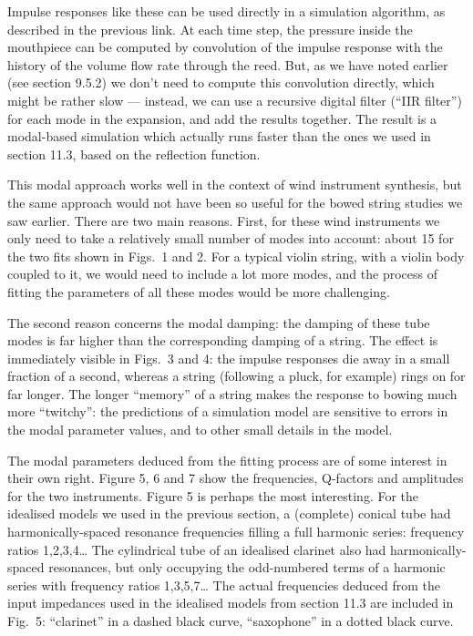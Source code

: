 

  Impulse responses like these can be used directly in a simulation algorithm, 
  as described in the previous link. At each time step, the pressure inside the 
  mouthpiece can be computed by convolution of the impulse response with the 
  history of the volume flow rate through the reed. But, as we have noted 
  earlier (see section 9.5.2) we don’t need to compute this convolution 
  directly, which might be rather slow — instead, we can use a recursive 
  digital filter (“IIR filter”) for each mode in the expansion, and add the 
  results together. The result is a modal-based simulation which actually runs 
  faster than the ones we used in section 11.3, based on the reflection 
  function. 

  This modal approach works well in the context of wind instrument synthesis, 
  but the same approach would not have been so useful for the bowed string 
  studies we saw earlier. There are two main reasons. First, for these wind 
  instruments we only need to take a relatively small number of modes into 
  account: about 15 for the two fits shown in Figs.\ 1 and 2. For a typical 
  violin string, with a violin body coupled to it, we would need to include a 
  lot more modes, and the process of fitting the parameters of all these modes 
  would be more challenging. 

  The second reason concerns the modal damping: the damping of these tube modes 
  is far higher than the corresponding damping of a string. The effect is 
  immediately visible in Figs.\ 3 and 4: the impulse responses die away in a 
  small fraction of a second, whereas a string (following a pluck, for example) 
  rings on for far longer. The longer “memory” of a string makes the response 
  to bowing much more “twitchy”: the predictions of a simulation model are 
  sensitive to errors in the modal parameter values, and to other small details 
  in the model. 

  The modal parameters deduced from the fitting process are of some interest in 
  their own right. Figure 5, 6 and 7 show the frequencies, Q-factors and 
  amplitudes for the two instruments. Figure 5 is perhaps the most interesting. 
  For the idealised models we used in the previous section, a (complete) 
  conical tube had harmonically-spaced resonance frequencies filling a full 
  harmonic series: frequency ratios 1,2,3,4… The cylindrical tube of an 
  idealised clarinet also had harmonically-spaced resonances, but only 
  occupying the odd-numbered terms of a harmonic series with frequency ratios 
  1,3,5,7… The actual frequencies deduced from the input impedances used in the 
  idealised models from section 11.3 are included in Fig.\ 5: ``clarinet'' in a 
  dashed black curve, ``saxophone'' in a dotted black curve. 


